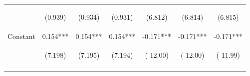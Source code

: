\documentclass[]{article}
\begin{document}
\begin{center}
\begin{tabular}{lcccccc}
        \vspace{4pt}     & \begin{footnotesize}(0.939)\end{footnotesize}  & \begin{footnotesize}(0.934)\end{footnotesize}  & \begin{footnotesize}(0.931)\end{footnotesize}  & \begin{footnotesize}(6.812)\end{footnotesize}  & \begin{footnotesize}(6.814)\end{footnotesize}  & \begin{footnotesize}(6.815)\end{footnotesize}  \\
        Constant         & 0.154***                                       & 0.154***                                       & 0.154***                                       & -0.171***                                      & -0.171***                                      & -0.171***                                      \\
                         & \begin{footnotesize}(7.198)\end{footnotesize}  & \begin{footnotesize}(7.195)\end{footnotesize}  & \begin{footnotesize}(7.194)\end{footnotesize}  & \begin{footnotesize}(-12.00)\end{footnotesize} & \begin{footnotesize}(-12.00)\end{footnotesize} & \begin{footnotesize}(-11.99)\end{footnotesize} \\
        \vspace{4pt}     & \begin{footnotesize}\end{footnotesize}         & \begin{footnotesize}\end{footnotesize}         & \begin{footnotesize}\end{footnotesize}         & \begin{footnotesize}\end{footnotesize}         & \begin{footnotesize}\end{footnotesize}         & \begin{footnotesize}\end{footnotesize}         \\

\end{tabular}
\end{center}
\end{document}

